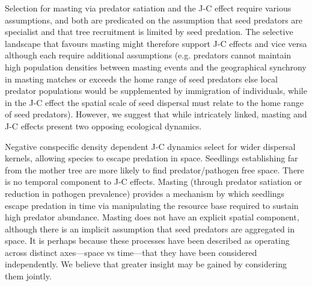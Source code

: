 \documentclass[11pt]{article}
\begin{document}
Selection for masting via predator satiation and the J-C effect require various assumptions, and both are predicated on the assumption that seed predators are specialist and that tree recruitment is limited by seed predation. The selective landscape that favours masting might therefore support J-C effects and vice versa although each require additional assumptions (e.g. predators cannot maintain high population densities between masting events and the geographical synchrony in masting matches or exceeds the home range of seed predators else local predator populations would be supplemented by immigration of individuals, while in the J-C effect the spatial scale of seed dispersal must relate to the home range of seed predators). However, we suggest that while intricately linked, masting and J-C effects present two opposing ecological dynamics.

Negative conspecific density dependent J-C dynamics select for wider dispersal kernels, allowing species to escape predation in space. Seedlings establishing far from the mother tree are more likely to find predator/pathogen free space. There is no temporal component to J-C effects. Masting (through predator satiation or reduction in pathogen prevalence) provides a mechanism by which seedlings escape predation in time via manipulating the resource base required to sustain high predator abundance. Masting does not have an explicit spatial component, although there is an implicit assumption that seed predators are aggregated in space. It is perhaps because these processes have been described as operating across distinct axes—space vs time—that they have been considered independently. We believe that greater insight may be gained by considering them jointly.
\end{document}
